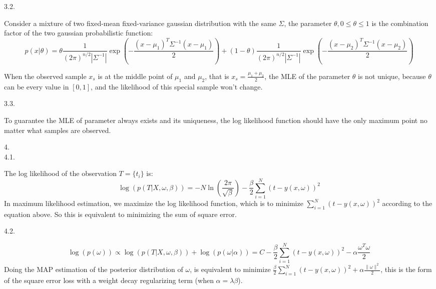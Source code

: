 \documentclass{article}
\theoremstyle{definition}
\theoremstyle{definition}
\theoremstyle{remark}
\begin{document}
3.2.

\begin{addmargin}[3em]{2em}
  Consider a mixture of two fixed-mean fixed-variance gaussian distribution with the same $\Sigma$, the parameter $\theta, 0 \leq \theta \leq 1$ is the combination factor of the two gaussian probabilistic function:
  \[
  p(x | \theta) = \theta \frac{1}{{(2\pi)}^{n/2}|\Sigma^{-1}|} \exp(-\frac{(x - \mu_1)^T \Sigma^{-1} (x - \mu_1)}{2}) + (1 - \theta) \frac{1}{{(2\pi)}^{n/2}|\Sigma^{-1}|} \exp(-\frac{{(x - \mu_2)}^T \Sigma^{-1} (x - \mu_2)}{2})
  \]

  When the observed sample $x_s$ is at the middle point of $\mu_1$ and $\mu_2$, that is $x_s = \frac{\mu_1 + \mu_2}{2}$, the MLE of the parameter $\theta$ is not unique, because $\theta$ can be every value in $[0, 1]$, and the likelihood of this special sample won't change.

\end{addmargin}

3.3.

\begin{addmargin}[3em]{2em}
  To guarantee the MLE of parameter always exists and its uniqueness, the log likelihood function should have the only maximum point no matter what samples are observed.
\end{addmargin}

4.\\
4.1.
\begin{addmargin}[3em]{2em}
  The log likelihood of the observation $T=\{t_i\}$ is:
  \[
  \log(p(T | X, \omega, \beta)) = -N \ln(\frac{2 \pi}{\sqrt{\beta}}) - \frac{\beta}{2} \sum_{i=1}^N {(t - y(x, \omega))}^2
  \]
  In maximum likelihood estimation, we maximize the log likelihood function, which is to minimize $\sum_{i=1}^N {(t - y(x, \omega))}^2$ according to the equation above. So this is equivalent to minimizing the sum of square error.
\end{addmargin}

4.2.

\begin{addmargin}[3em]{2em}
  \[
  \log(p(\omega)) \propto \log(p(T | X, \omega, \beta)) + \log(p(\omega | \alpha)) = C - \frac{\beta}{2} \sum_{i=1}^N {(t - y(x, \omega))}^2 - \alpha \frac{\omega^T \omega}{2}
  \]
  Doing the MAP estimation of the posterior distribution of $\omega$, is equivalent to minimize $\frac{\beta}{2} \sum_{i=1}^N {(t - y(x, \omega))}^2 + \alpha \frac{\|\omega\|^2}{2}$, this is the form of the square error loss with a weight decay regularizing term (when $\alpha = \lambda \beta$).
\end{addmargin}
\end{document}
